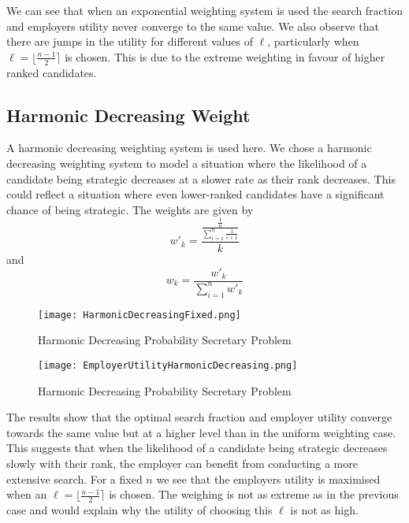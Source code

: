 \documentclass{article}
\begin{document}
We can see that when an exponential weighting system is used the search fraction and employers utility never converge to the same value. We also observe that there are jumps in the utility for different values of $\ell$, particularly when $\ell=\lfloor \frac{n-1}{2} \rceil$ is chosen. This is due to the extreme weighting in favour of higher ranked candidates.


\subsection{Harmonic Decreasing Weight}

A harmonic decreasing weighting system is used here. We chose a harmonic decreasing weighting system to model a situation where the likelihood of a candidate being strategic decreases at a slower rate as their rank decreases. This could reflect a situation where even lower-ranked candidates have a significant chance of being strategic. The weights are given by 
$$ w'_k = \frac{\frac{\frac{1}{n}}{\sum_{i=1}^{n}\frac{1}{i+1}}}{k}$$
and 
$$ w_k = \frac{w'_k}{\sum_{i=1}^{n}w'_k}$$


\begin{table}[H]
\centering
\begin{minipage}{0.5\textwidth}
\small
\begin{figure}[H]
\centering
\centering
\texttt{[image: HarmonicDecreasingFixed.png]}
\caption{Harmonic Decreasing Probability Secretary Problem}
\label{fig:harmonic_decreasing}
\end{figure}
\end{minipage}\hfill
\centering
\begin{minipage}{0.5\textwidth}
\small
\begin{figure}[H]
\centering
\centering
\texttt{[image: EmployerUtilityHarmonicDecreasing.png]}
\caption{Harmonic Decreasing Probability Secretary Problem}
\label{fig:harmonic_decreasing_employer_utility}
\end{figure}
\end{minipage}\hfill
\end{table}

The results show that the optimal search fraction and employer utility converge towards the same value but at a higher level than in the uniform weighting case. This suggests that when the likelihood of a candidate being strategic decreases slowly with their rank, the employer can benefit from conducting a more extensive search. For a fixed $n$ we see that the employers utility is maximised when an $\ell=\lfloor \frac{n-1}{2} \rceil$ is chosen. The weighing is not as extreme as in the previous case and would explain why the utility of choosing this $\ell$ is not as high. 
\end{document}
